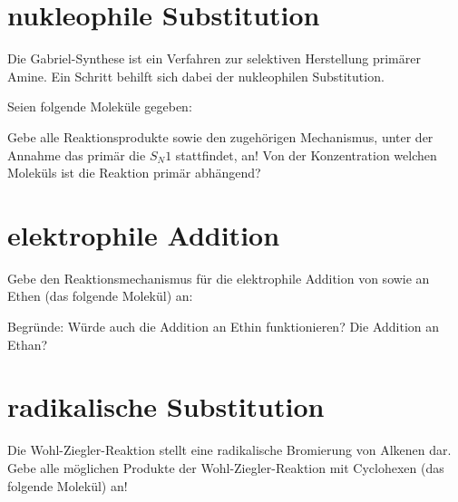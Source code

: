 \section{nukleophile Substitution}
\begin{task}
	Die Gabriel-Synthese ist ein Verfahren zur selektiven Herstellung primärer Amine. Ein Schritt behilft sich dabei der nukleophilen Substitution.

	Seien folgende Moleküle gegeben:

	\vspace{2em}
	\hspace{100pt}
	\vspace{2em}

	Gebe alle Reaktionsprodukte sowie den zugehörigen Mechanismus, unter der Annahme das primär die $S_N1$ stattfindet, an! Von der Konzentration welchen Moleküls ist die Reaktion primär abhängend?
\end{task}

\section{elektrophile Addition}
\begin{task}
Gebe den Reaktionsmechanismus für die elektrophile Addition von  sowie  an Ethen (das folgende Molekül) an:

\vspace{2em}

\end{task}

\begin{task}
	Begründe: Würde auch die Addition an Ethin funktionieren? Die Addition an Ethan?
\end{task}

\section{radikalische Substitution}
\begin{task}
Die Wohl-Ziegler-Reaktion stellt eine radikalische Bromierung von Alkenen dar. Gebe alle möglichen Produkte der Wohl-Ziegler-Reaktion mit Cyclohexen (das folgende Molekül) an!

\vspace{2em}
\end{task}
